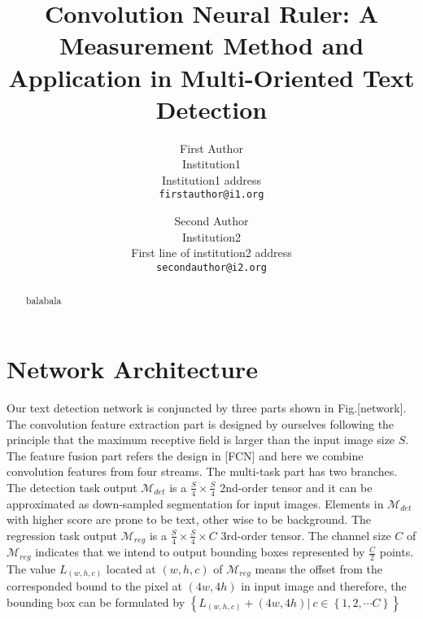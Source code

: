\documentclass[10pt,twocolumn,letterpaper]{article}
\begin{document}
	
	\title{Convolution Neural Ruler: A Measurement Method and Application in Multi-Oriented Text Detection}
	
	\author{First Author\\
		Institution1\\
		Institution1 address\\
		{\tt\small firstauthor@i1.org}
		\and
		Second Author\\
		Institution2\\
		First line of institution2 address\\
		{\tt\small secondauthor@i2.org}
	}
	
	\maketitle
	
	\begin{abstract}
	balabala
	\end{abstract}
	
	\section{Network Architecture}
	Our text detection network is conjuncted by three parts shown in Fig.[network]. 
	The convolution feature extraction part is designed by ourselves following the principle that the maximum receptive field is larger than the input image size $S$. 
	The feature fusion part refers the design in [FCN] and here we combine convolution features from four streams. 
	The multi-task part has two branches. 
	The detection task output $\mathcal{M}_{det}$ is a $\frac{S}{4} \times \frac{S}{4}$ 2nd-order tensor and it can be approximated as down-sampled segmentation for input images. Elements in $\mathcal{M}_{det}$ with higher score are prone to be text, other wise to be background.
	The regression task output $\mathcal{M}_{reg}$ is a $\frac{S}{4} \times \frac{S}{4} \times C$ 3rd-order tensor. The channel size $C$ of $\mathcal{M}_{reg}$ indicates that we intend to output bounding boxes represented by $\frac{C}{2}$ points. The value $L_{\left(w, h, c\right)}$ located at $\left(w, h, c\right)$ of $\mathcal{M}_{reg}$ means the offset from the corresponded bound to the pixel at $\left(4w, 4h\right)$ in input image and therefore, the bounding box can be formulated by 
	$\left\{ L_{\left(w, h, c\right)} + \left(4w, 4h\right) \vert \ c \in \left\{1, 2, \cdots C \right\} \right\}$
	
\end{document}
